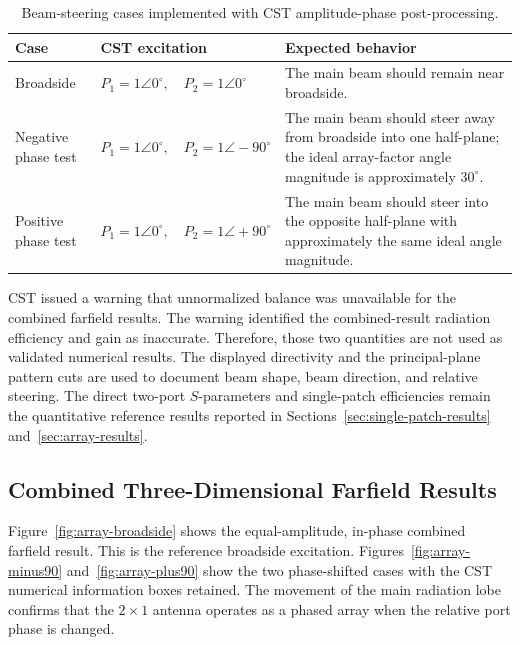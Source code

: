 \begin{table}[H]
\centering
\caption[Beam-steering cases used in CST.]{Beam-steering cases implemented with CST amplitude-phase post-processing.}
\label{tab:cst-beamsteering-cases}
\small
\setlength{\tabcolsep}{4pt}
\renewcommand{\arraystretch}{1.25}
\begin{tabularx}{\textwidth}{@{}
>{\raggedright\arraybackslash}p{}
>{\raggedright\arraybackslash}p{}
>{\raggedright\arraybackslash}X
@{}}
\toprule
\textbf{Case} &
\textbf{CST excitation} &
\textbf{Expected behavior} \\
\midrule
Broadside &
\(P_1=1\angle0^\circ,\quad P_2=1\angle0^\circ\) &
The main beam should remain near broadside. \\
Negative phase test &
\(P_1=1\angle0^\circ,\quad P_2=1\angle-90^\circ\) &
The main beam should steer away from broadside into one half-plane; the ideal array-factor angle magnitude is approximately \(30^\circ\). \\
Positive phase test &
\(P_1=1\angle0^\circ,\quad P_2=1\angle+90^\circ\) &
The main beam should steer into the opposite half-plane with approximately the same ideal angle magnitude. \\
\bottomrule
\end{tabularx}
\end{table}

CST issued a warning that unnormalized balance was unavailable for the combined farfield results.
The warning identified the combined-result radiation efficiency and gain as inaccurate. Therefore,
those two quantities are not used as validated numerical results. The displayed directivity and the
principal-plane pattern cuts are used to document beam shape, beam direction, and relative steering.
The direct two-port \(S\)-parameters and single-patch efficiencies remain the quantitative reference
results reported in Sections~\ref{sec:single-patch-results} and~\ref{sec:array-results}.

\subsection{Combined Three-Dimensional Farfield Results}

Figure~\ref{fig:array-broadside} shows the equal-amplitude, in-phase combined farfield result. This is
the reference broadside excitation. Figures~\ref{fig:array-minus90} and~\ref{fig:array-plus90} show
the two phase-shifted cases with the CST numerical information boxes retained. The movement of the
main radiation lobe confirms that the \(2\times1\) antenna operates as a phased array when the relative
port phase is changed.


